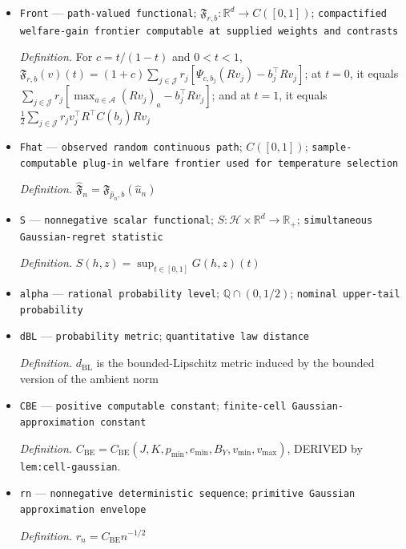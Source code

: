 \documentclass{article}
\begin{document}
\begin{itemize}
  \par\smallskip\noindent\emph{Definition.} \(T_n=G(u_n,E_n)\)
  \item \texttt{Front} --- \texttt{path-\allowbreak{}valued functional}; \(\mathfrak F_{r,b}:\mathbb R^d\to C([0,1])\); \texttt{compactified welfare-\allowbreak{}gain frontier computable at supplied weights and contrasts}
  \par\smallskip\noindent\emph{Definition.} For \(c=t/(1-t)\) and \(0<t<1\), \(\mathfrak F_{r,b}(v)(t)=(1+c)\sum_{j\in\mathcal J}r_j[\Psi_{c,b_j}(Rv_j)-b_j^{\top}Rv_j]\); at \(t=0\), it equals \(\sum_{j\in\mathcal J}r_j[\max_{a\in\mathcal A}(Rv_j)_a-b_j^{\top}Rv_j]\); and at \(t=1\), it equals \(\frac12\sum_{j\in\mathcal J}r_jv_j^{\top}R^{\top}C(b_j)Rv_j\)
  \item \texttt{Fhat} --- \texttt{observed random continuous path}; \(C([0,1])\); \texttt{sample-\allowbreak{}computable plug-\allowbreak{}in welfare frontier used for temperature selection}
  \par\smallskip\noindent\emph{Definition.} \(\widehat{\mathfrak F}_n=\mathfrak F_{\widehat p_n,b}(\widehat u_n)\)
  \item \texttt{S} --- \texttt{nonnegative scalar functional}; \(S:\mathcal H\times\mathbb R^d\to\mathbb R_+\); \texttt{simultaneous Gaussian-\allowbreak{}regret statistic}
  \par\smallskip\noindent\emph{Definition.} \(S(h,z)=\sup_{t\in[0,1]}G(h,z)(t)\)
  \item \texttt{alpha} --- \texttt{rational probability level}; \(\mathbb Q\cap(0,1/2)\); \texttt{nominal upper-\allowbreak{}tail probability}
  \item \texttt{dBL} --- \texttt{probability metric}; \texttt{quantitative law distance}
  \par\smallskip\noindent\emph{Definition.} \(d_{\mathrm{BL}}\) is the bounded-Lipschitz metric induced by the bounded version of the ambient norm
  \item \texttt{CBE} --- \texttt{positive computable constant}; \texttt{finite-\allowbreak{}cell Gaussian-\allowbreak{}approximation constant}
  \par\smallskip\noindent\emph{Definition.} \(C_{\mathrm{BE}}=C_{\mathrm{BE}}(J,K,p_{\min},e_{\min},B_Y,v_{\min},v_{\max})\), DERIVED by \texttt{lem:cell-gaussian}.
  \item \texttt{rn} --- \texttt{nonnegative deterministic sequence}; \texttt{primitive Gaussian approximation envelope}
  \par\smallskip\noindent\emph{Definition.} \(r_n=C_{\mathrm{BE}}n^{-1/2}\)

\end{itemize}
\end{document}
